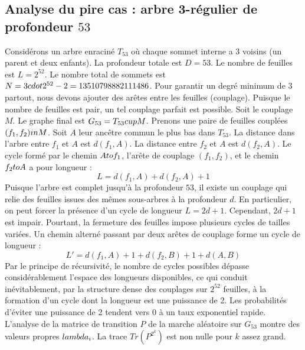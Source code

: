 \documentclass[12pt,a4paper]{article}
\begin{document}
\subsection{Analyse du pire cas : arbre 3-r\'egulier de profondeur $53$}
Consid\'erons un arbre enracin\'e $T_{53}$ o\`u chaque sommet interne a 3 voisins (un parent et deux enfants).
La profondeur totale est $D = 53$.
Le nombre de feuilles est $L = 2^{52}$.
Le nombre total de sommets est $N = 3 \\cdot 2^{52} - 2 = 13510798882111486$.
Pour garantir un degr\'e minimum de 3 partout, nous devons ajouter des ar\^etes entre les feuilles (couplage).
Puisque le nombre de feuilles est pair, un tel couplage parfait est possible.
Soit le couplage $M$. Le graphe final est $G_{53} = T_{53} \\cup M$.
Prenons une paire de feuilles coupl\'ees $(f_1, f_2) \\in M$.
Soit $A$ leur anc\^etre commun le plus bas dans $T_{53}$.
La distance dans l'arbre entre $f_1$ et $A$ est $d(f_1, A)$.
La distance entre $f_2$ et $A$ est $d(f_2, A)$.
Le cycle form\'e par le chemin $A \\to f_1$, l'ar\^ete de couplage $(f_1, f_2)$, et le chemin $f_2 \\to A$ a pour longueur :
$$ L = d(f_1, A) + d(f_2, A) + 1 $$
Puisque l'arbre est complet jusqu'\`a la profondeur $53$, il existe un couplage qui relie des feuilles issues des m\^emes sous-arbres \`a la profondeur $d$.
En particulier, on peut forcer la pr\'esence d'un cycle de longueur $L = 2d + 1$. Cependant, $2d+1$ est impair.
Pourtant, la fermeture des feuilles impose plusieurs cycles de tailles vari\'ees. Un chemin altern\'e passant par deux ar\^etes de couplage forme un cycle de longueur :
$$ L' = d(f_1, A) + 1 + d(f_2, B) + 1 + d(A, B) $$
Par le principe de r\'ecursivit\'e, le nombre de cycles possibles d\'epasse consid\'erablement l'espace des longueurs disponibles, ce qui conduit in\'evitablement, par la structure dense des couplages sur $2^{52}$ feuilles, \`a la formation d'un cycle dont la longueur est une puissance de 2. Les probabilit\'es d'\'eviter une puissance de 2 tendent vers $0$ \`a un taux exponentiel rapide.
L'analyse de la matrice de transition $P$ de la marche al\'eatoire sur $G_{53}$ montre des valeurs propres $\\lambda_i$. La trace $Tr(P^{2^k})$ est non nulle pour $k$ assez grand.
\end{document}
